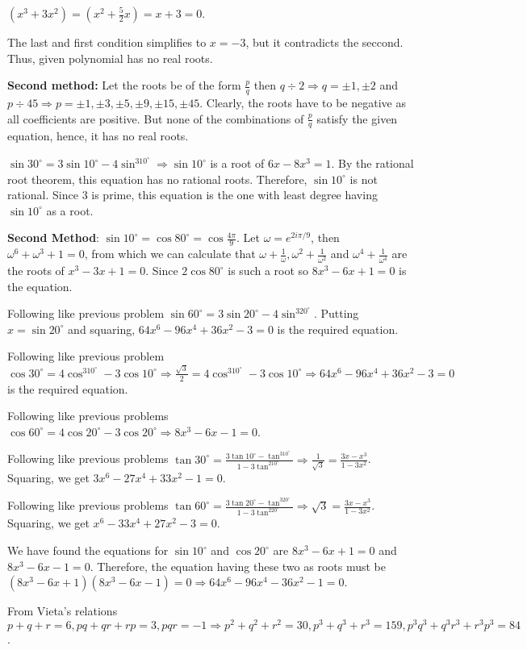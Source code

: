   $(x^3 + 3x^2) = \left(x^2 + \frac{5}{2}x\right) = x + 3 = 0$.

  The last and first condition simplifies to $x = -3$, but it contradicts the seccond. Thus, given
  polynomial has no real roots.

  {\bf Second method:} Let the roots be of the form $\frac{p}{q}$ then $q\div 2 \Rightarrow q = \pm 1, \pm
  2$ and $p\div 45 \Rightarrow p = \pm1, \pm3, \pm5, \pm9, \pm15, \pm45$. Clearly, the roots have to be
  negative as all coefficients are positive. But none of the combinations of $\frac{p}{q}$ satisfy the given
  equation, hence, it has no real roots.
\item $\sin30^\circ = 3\sin10^\circ - 4\sin^310^\circ \Rightarrow \sin10^\circ$ is a root of $6x - 8x^3 =
  1$. By the rational root theorem, this equation has no rational roots. Therefore, $\sin10^\circ$ is not
  rational. Since $3$ is prime, this equation is the one with least degree having $\sin10^\circ$ as a root.

  {\bf Second Method}: $\sin10^\circ = \cos80^\circ = \cos\frac{4\pi}{9}$. Let $\omega = e^{2i\pi/9}$, then
  $\omega^6 + \omega^3 + 1 = 0$, from which we can calculate that $\omega + \frac{1}{\omega}, \omega^2 +
  \frac{1}{\omega^2}$ and $\omega^4 + \frac{1}{\omega^4}$ are the roots of $x^3 - 3x + 1 = 0$. Since
  $2\cos80^\circ$ is such a root so $8x^3 - 6x + 1 = 0$ is the equation.
\item Following like previous problem $\sin60^\circ = 3\sin20^\circ - 4\sin^320^\circ$. Putting $x =
  \sin20^\circ$ and squaring, $64x^6 - 96x^4 + 36x^2 - 3 = 0$ is the required equation.
\item Following like previous problem $\cos30^\circ = 4\cos^310^\circ - 3\cos10^\circ \Rightarrow
  \frac{\sqrt{3}}{2} = 4\cos^310^\circ - 3\cos10^\circ \Rightarrow 64x^6 - 96x^4 + 36x^2 - 3 = 0$ is the
  required equation.
\item Following like previous problems $\cos60^\circ = 4\cos20^\circ - 3\cos20^\circ \Rightarrow 8x^3 - 6x -
  1 = 0$.
\item Following like previous problems $\tan30^\circ = \frac{3\tan10^\circ - \tan^310^\circ}{1 -
  3\tan^210^\circ} \Rightarrow \frac{1}{\sqrt{3}} = \frac{3x - x^3}{1 - 3x^2}$. Squaring, we get
  $3x^6 - 27x^4 + 33x^2 - 1 = 0$.
\item Following like previous problems $\tan60^\circ = \frac{3\tan20^\circ - \tan^320^\circ}{1 -
  3\tan^220^\circ} \Rightarrow \sqrt{3} = \frac{3x - x^3}{1 - 3x^2}$. Squaring, we get
  $x^6 - 33x^4 + 27x^2 - 3 = 0$.
\item We have found the equations for $\sin10^\circ$ and $\cos20^\circ$ are $8x^3 - 6x + 1 = 0$ and $8x^3 -
  6x - 1 = 0$. Therefore, the equation having these two as roots must be $(8x^3 - 6x + 1)(8x^3 - 6x - 1) = 0
  \Rightarrow 64x^6 - 96x^4 - 36x^2 - 1 = 0$.
\item From Vieta's relations $p + q + r = 6, pq + qr + rp = 3, pqr = -1\Rightarrow p^2 + q^2 + r^2 = 30, p^3
  + q^3 + r^3 = 159, p^3q^3 + q^3r^3 + r^3p^3 = 84$.


